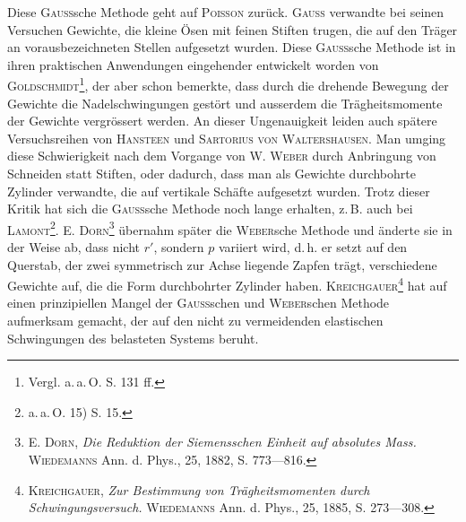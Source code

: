 Diese \textsc{Gauss}sche Methode geht auf \textsc{Poisson} zurück. \textsc{Gauss} verwandte
bei seinen Versuchen Gewichte, die kleine Ösen mit feinen Stiften trugen,
die auf den Träger an vorausbezeichneten Stellen aufgesetzt wurden. Diese
\textsc{Gauss}sche Methode ist in ihren praktischen Anwendungen eingehender entwickelt
worden von \textsc{Goldschmidt}\footnote{Vergl. a.\,a.\,O. S. 131 ff.}, der aber schon bemerkte, dass durch die
drehende Bewegung der Gewichte die Nadelschwingungen gestört und ausserdem
die Trägheitsmomente der Gewichte vergrössert werden. An dieser Ungenauigkeit
leiden auch spätere Versuchsreihen von \textsc{Hansteen} und \textsc{Sartorius von Waltershausen}.
Man umging diese Schwierigkeit nach dem Vorgange von \textsc{W. Weber}
durch Anbringung von Schneiden statt Stiften, oder dadurch, dass man als
Gewichte durchbohrte Zylinder verwandte, die auf vertikale Schäfte aufgesetzt
wurden. Trotz dieser Kritik hat sich die \textsc{Gauss}sche Methode noch lange erhalten,
z.\,B. auch bei \textsc{Lamont}\footnote{a.\,a.\,O. 15) S. 15.}. \textsc{E. Dorn}\footnote{\textsc{E. Dorn}, \textit{Die Reduktion der Siemensschen Einheit auf absolutes Mass.} \textsc{Wiedemanns} Ann. d. Phys., 25, 1882, S. 773—816.} übernahm später die \textsc{Weber}sche
Methode und änderte sie in der Weise ab, dass nicht \(r'\), sondern \(p\) variiert
wird, d.\,h. er setzt auf den Querstab, der zwei symmetrisch zur Achse liegende
Zapfen trägt, verschiedene Gewichte auf, die die Form durchbohrter Zylinder
haben. \textsc{Kreichgauer}\footnote{\textsc{Kreichgauer}, \textit{Zur Bestimmung von Trägheitsmomenten durch Schwingungsversuch.} \textsc{Wiedemanns} Ann. d. Phys., 25, 1885, S. 273—308.} hat auf einen prinzipiellen Mangel der \textsc{Gauss}schen
und \textsc{Weber}schen Methode aufmerksam gemacht, der auf den nicht zu vermeidenden
elastischen Schwingungen des belasteten Systems beruht.
\clearpage\endgroup
